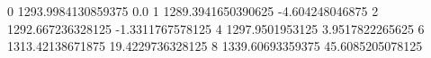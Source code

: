 0 1293.9984130859375 0.0
1 1289.3941650390625 -4.604248046875
2 1292.667236328125 -1.3311767578125
4 1297.9501953125 3.9517822265625
6 1313.42138671875 19.4229736328125
8 1339.60693359375 45.6085205078125
